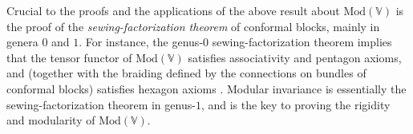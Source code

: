 \documentclass[11pt,b5paper,notitlepage]{article}
\theoremstyle{definition}
\theoremstyle{plain}
\newcommand{\Vbb}{\mathbb V}
\newcommand{\<}{\left\langle}
\renewcommand{\>}{\right\rangle}
\newcommand{\Mod}{\mathrm{Mod}}
\numberwithin{equation}{section}
\begin{document}





Crucial to the proofs and the applications of the above result about $\Mod(\Vbb)$ is the proof of the \emph{sewing-factorization theorem} of conformal blocks, mainly in genera $0$ and $1$. For instance, the genus-$0$ sewing-factorization theorem implies that the tensor functor of $\Mod(\Vbb)$ satisfies associativity and pentagon axioms, and (together with the braiding defined by the connections on bundles of conformal blocks) satisfies hexagon axioms \cite{Hua-tensor-4,NT-P1_conformal_blocks,Hua-rigidity-modularity}. Modular invariance \cite{Zhu-modular-invariance,DLM-modular-invariance,Hua-differential-genus-1} is essentially the sewing-factorization theorem in genus-$1$, and is the key to proving the rigidity and modularity of $\Mod(\Vbb)$. %
\end{document}
